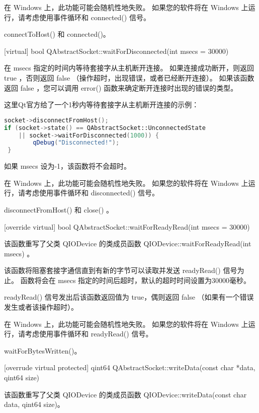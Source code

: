 \begin{notice}
在 Windows 上，此功能可能会随机性地失败。 如果您的软件将在 Windows 上运行，请考虑使用事件循环和 connected() 信号。
\end{notice}



\begin{seeAlso}
connectToHost() 和 connected()。
\end{seeAlso}

\splitLine

[virtual] bool QAbstractSocket::waitForDisconnected(int msecs = 30000)

在 msecs 指定的时间内等待套接字从主机断开连接。 如果连接成功断开，则返回 true ，否则返回 false （操作超时，出现错误，或者已经断开连接）。 如果该函数返回 false ，您可以调用 error() 函数来确定断开连接时出现的错误的类型。

这里Qt官方给了一个1秒内等待套接字从主机断开连接的示例：

\begin{lstlisting}[language=C++]
socket->disconnectFromHost();
if (socket->state() == QAbstractSocket::UnconnectedState
	|| socket->waitForDisconnected(1000)) {
		qDebug("Disconnected!");
 }
\end{lstlisting}

如果 msecs 设为-1，该函数将不会超时。

\begin{notice}
在 Windows 上，此功能可能会随机性地失败。 如果您的软件将在 Windows 上运行，请考虑使用事件循环和 disconnected() 信号。
\end{notice}




\begin{seeAlso}
disconnectFromHost() 和 close() 。
\end{seeAlso}

\splitLine

[override virtual] bool QAbstractSocket::waitForReadyRead(int msecs =
30000)

该函数重写了父类 QIODevice 的类成员函数 QIODevice::waitForReadyRead(int msecs) 。

该函数将阻塞套接字通信直到有新的字节可以读取并发送 readyRead() 信号为止。 函数将会在 msecs 指定的时间后超时，默认的超时时间设置为30000毫秒。

readyRead() 信号发出后该函数返回值为 true，偶则返回 false （如果有一个错误发生或者该操作超时）。

\begin{notice}
在 Windows 上，此功能可能会随机性地失败。 如果您的软件将在 Windows 上运行，请考虑使用事件循环和 readyRead() 信号。
\end{notice}


\begin{seeAlso}
waitForBytesWritten()。
\end{seeAlso}


\splitLine

[overrude virtual protected] qint64 QAbstractSocket::writeData(const char *data, qint64 size)

该函数重写了父类 QIODevice 的类成员函数 QIODevice::writeData(const
char data, qint64 size)。
